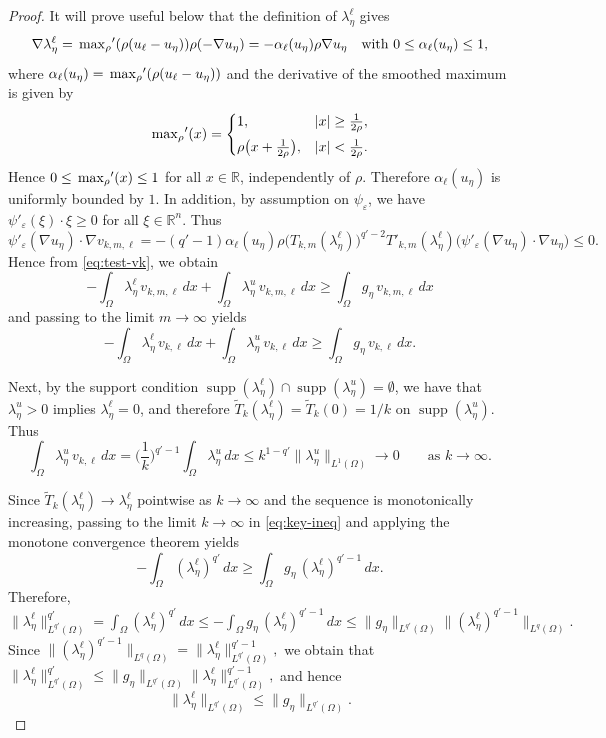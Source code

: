 \documentclass[11pt]{article}
\newcommand{\maxrho}{\sideset{}{_\rho}{\max}}
\DeclareMathOperator{\supp}{supp}
\theoremstyle{definition}
\theoremstyle{remark}
\begin{document}
\begin{proof}
It will prove useful below that the definition of $\lambda^\ell_\eta$ gives
\[
  \nabla \lambda^\ell_\eta
  =\maxrho\nolimits'(\rho(u_\ell-u_\eta))\rho(-\nabla u_\eta)
  = -\alpha_\ell(u_\eta) \rho \nabla u_\eta
  \quad \text{with }0\le \alpha_\ell(u_\eta)\le 1,
\]
where $\alpha_\ell(u_\eta) = \maxrho\nolimits'(\rho(u_\ell-u_\eta))$
and the derivative of the smoothed maximum is given by
\[
\maxrho\nolimits'(x)
=
\begin{cases}
1, & |x|\ge \tfrac{1}{2\rho},\\[4pt]
\rho \bigl(x+\tfrac{1}{2\rho}\bigr), & |x|<\tfrac{1}{2\rho}.
\end{cases}
\]
Hence $0 \le \maxrho\nolimits'(x) \le 1$ for all $x\in\mathbb{R}$,
independently of $\rho$. Therefore $\alpha_\ell(u_\eta)$ is uniformly bounded by $1$.
In addition, by assumption on $\psi_\varepsilon$, we have $\psi'_\varepsilon(\xi)\cdot\xi\ge 0$
for all $\xi\in\mathbb{R}^n$. Thus
\[
  \psi'_\varepsilon(\nabla u_\eta)\cdot\nabla v_{k,m,\ell}
  = -(q'-1)\alpha_\ell(u_\eta)\rho\big(T_{k,m}(\lambda^\ell_\eta)\big)^{q'-2}
     T'_{k,m}(\lambda^\ell_\eta)
     \big(\psi'_\varepsilon(\nabla u_\eta)\cdot\nabla u_\eta\big)
  \le 0.
\]
Hence from \eqref{eq:test-vk}, we obtain
\begin{equation}\label{eq:key-ineq-m}
-\int_\Omega \lambda^\ell_\eta\,v_{k,m,\ell}\,dx
+\int_\Omega \lambda^u_\eta\,v_{k,m,\ell}\,dx
\ge
\int_\Omega g_\eta\,v_{k,m,\ell}\,dx
\end{equation}
%
and passing to the limit $m\to\infty$ yields
%
\begin{equation}\label{eq:key-ineq}
-\int_\Omega \lambda^\ell_\eta\,v_{k,\ell}\,dx
+\int_\Omega \lambda^u_\eta\,v_{k,\ell}\,dx
\ge
\int_\Omega g_\eta\,v_{k,\ell}\,dx.
\end{equation}

Next, by the support condition
$\supp(\lambda^\ell_\eta)\cap\supp(\lambda^u_\eta)=\emptyset$, we have
that $\lambda^u_\eta>0$ implies $\lambda^\ell_\eta=0$, and therefore
$\tilde T_k(\lambda^\ell_\eta)=\tilde T_k(0)=1/k$ on $\supp(\lambda^u_\eta)$.
Thus
\[
  \int_\Omega \lambda^u_\eta\,v_{k,\ell}\,dx
  = \Big(\frac{1}{k}\Big)^{q'-1}\int_\Omega \lambda^u_\eta\,dx
  \le k^{1-q'}\|\lambda^u_\eta\|_{L^1(\Omega)}
  \to 0
  \qquad \text{as } k\to\infty.
\]

Since $\tilde T_k(\lambda^\ell_\eta)\to \lambda^\ell_\eta$ pointwise as $k\to\infty$ and
the sequence is monotonically increasing, passing to the limit $k\to\infty$ in
\eqref{eq:key-ineq} and applying the monotone convergence theorem yields
\[
  -\int_\Omega (\lambda^\ell_\eta)^{q'}\,dx
  \ge
  \int_\Omega g_\eta\,(\lambda^\ell_\eta)^{q'-1}\,dx .
\]
Therefore,
$\|\lambda^\ell_\eta\|_{L^{q'}(\Omega)}^{q'}
  = \int_\Omega (\lambda^\ell_\eta)^{q'}\,dx
  \le - \int_\Omega g_\eta\,(\lambda^\ell_\eta)^{q'-1}\,dx
  \le \|g_\eta\|_{L^{q'}(\Omega)}
     \|(\lambda^\ell_\eta)^{q' - 1}\|_{L^q(\Omega)}.
$
Since
$  \|(\lambda^\ell_\eta)^{q'-1}\|_{L^q(\Omega)}
  = \|\lambda^\ell_\eta\|_{L^{q'}(\Omega)}^{q'-1},
$
we obtain that
$\|\lambda^\ell_\eta\|_{L^{q'}(\Omega)}^{q'}
  \le
  \|g_\eta\|_{L^{q'}(\Omega)}
  \|\lambda^\ell_\eta\|_{L^{q'}(\Omega)}^{q'-1},
$ and hence
\[
\|\lambda^\ell_\eta\|_{L^{q'}(\Omega)}
\le \|g_\eta\|_{L^{q'}(\Omega)}.
\]


\end{proof}
\end{document}
